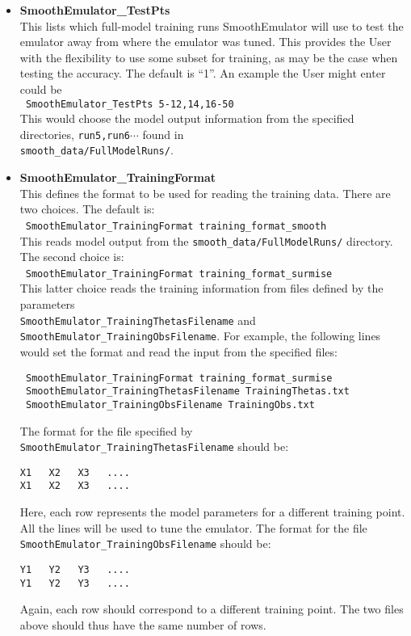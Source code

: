 \documentclass[UserManual.tex]{subfiles}
\begin{document}
\begin{itemize}
\item {\bf SmoothEmulator\_TestPts}\\
This lists which full-model training runs SmoothEmulator will use to test the emulator away from where the emulator was tuned. This provides the User with the flexibility to use some subset for training, as may be the case when testing the accuracy. The default is ``1''. An example the User might enter could be\\
{\tt ~SmoothEmulator\_TestPts 5-12,14,16-50 }\\
This would choose the model output information from the specified directories, {\tt run5,run6}$\cdots$ found in \\{\tt smooth\_data/FullModelRuns/}.

\item {\bf SmoothEmulator\_TrainingFormat}\\
This defines the format to be used for reading the training data. There are two choices. The default is:\\
~{\tt SmoothEmulator\_TrainingFormat training\_format\_smooth}\\
This reads model output from the {\tt smooth\_data/FullModelRuns/} directory. The second choice is:\\
~{\tt SmoothEmulator\_TrainingFormat training\_format\_surmise}\\
This latter choice reads the training information from files defined by the parameters\\
{\tt SmoothEmulator\_TrainingThetasFilename} and {\tt 
 SmoothEmulator\_TrainingObsFilename}. For example, the following lines would set the format and read the input from the specified files:
 
 \vspace*{-8pt}
 {\tt\begin{verbatim}
 SmoothEmulator_TrainingFormat training_format_surmise
 SmoothEmulator_TrainingThetasFilename TrainingThetas.txt
 SmoothEmulator_TrainingObsFilename TrainingObs.txt
 \end{verbatim}}
 \vspace*{-24pt}
The format for the file specified by {\tt SmoothEmulator\_TrainingThetasFilename} should be:
\vspace*{-8pt}
{\tt\begin{verbatim}
X1   X2   X3   ....
X1   X2   X3   ....
\end{verbatim}}
\vspace*{-8pt}
Here, each row represents the model parameters for a different training point. All the lines will be used to tune the emulator. The format for the file {\tt SmoothEmulator\_TrainingObsFilename} should be:
\vspace*{-8pt}
{\tt\begin{verbatim}
Y1   Y2   Y3   ....
Y1   Y2   Y3   ....
\end{verbatim}}
\vspace*{-8pt}
Again, each row should correspond to a different training point. The two files above should thus have the same number of rows.


\end{itemize}
\end{document}
